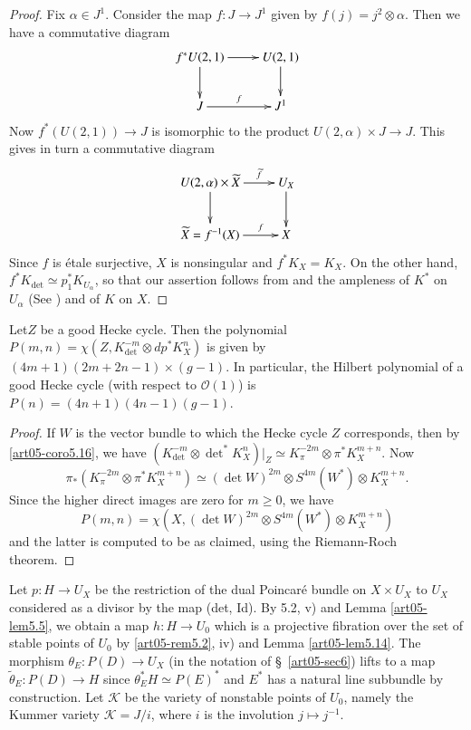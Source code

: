 \begin{proof}
Fix $\alpha\in J^{1}$. Consider the map $f:J\to J^{1}$ given by
$f(j)=j^{2}\otimes \alpha$. Then we have a commutative diagram
\[
\xymatrix{
f^{*}U(2,1)\ar[d]\ar[r] & U(2,1)\ar[d]\\
J\ar[r]^-{f} & J^{1}
}
\]
Now $f^{*}(U(2,1))\to J$ is isomorphic to the product
$U(2,\alpha)\times J\to J$. This gives in turn a commutative diagram
\[
\xymatrix{
U(2,\alpha)\times \widetilde{X}\ar[d]\ar[r]^-{\widetilde{f}} &
U_{X}\ar[d]\\
\widetilde{X}=f^{-1}(X)\ar[r]^-{f} & X
}
\]
Since $f$ is \'etale surjective, $X$ is nonsingular and
$f^{*}K_{X}=K_{X}$. On the other hand, $f^{*}K_{\det}\simeq
p^{*}_{1}K_{U_{\alpha}}$, so that our assertion follows
from \cite[Proposition 4.4]{art05-key2} and the ampleness of $K^{*}$
on $U_{\alpha}$ (See \cite[Theorem 1]{art05-key6}) and of $K$ on $X$.
\end{proof}

\begin{lemma}\label{art05-lem7.2}
Let\pageoriginale $Z$ be a good Hecke cycle. Then the polynomial
$P(m,n)=\chi(Z,K^{-m}_{\det}\otimes dp^{*}K^{n}_{X})$ is given by
$(4m+1)(2m+2n-1)\times (g-1)$. In particular, the Hilbert polynomial
of a good Hecke cycle (with respect to $\mathscr{O}(1)$) is
$P(n)=(4n+1)(4n-1)(g-1)$. 
\end{lemma}

\begin{proof}
If $W$ is the vector bundle to which the Hecke cycle $Z$ corresponds,
then by \ref{art05-coro5.16}, we have
$(K^{-m}_{\det}\otimes \det^{*}K^{n}_{X})|_{Z}\simeq
K^{-2m}_{\pi}\otimes \pi^{*}K^{m+n}_{X}$. Now
$$
\pi_{*}(K^{-2m}_{\pi}\otimes \pi^{*}K^{m+n}_{X})\simeq (\det
W)^{2m}\otimes S^{4m}(W^{*})\otimes K^{m+n}_{X}.
$$
Since the higher direct images are zero for $m\geq 0$, we have
$$
P(m,n)=\chi(X,(\det W)^{2m}\otimes S^{4m}(W^{*})\otimes K^{m+n}_{X})
$$
and the latter is computed to be as claimed, using the Riemann-Roch
theorem. 
\end{proof}

Let $p:H\to U_{X}$ be the restriction of the dual Poincar\'e bundle on
$X\times U_{X}$ to $U_{X}$ considered as a divisor by the map (det,
Id). By 5.2, v) and Lemma \ref{art05-lem5.5}, we obtain a map $h:H\to
U_{0}$ which is a projective fibration over the set of stable points
of $U_{0}$ by \ref{art05-rem5.2}, iv) and
Lemma \ref{art05-lem5.14}. The morphism $\theta_{E}:P(D)\to U_{X}$ (in
the notation of \S\ \ref{art05-sec6}) lifts to a map
$\widetilde{\theta}_{E}:P(D)\to H$ since $\theta^{*}_{E}H\simeq
P(E)^{*}$ and $E^{*}$ has a natural line subbundle by
construction. Let $\mathscr{K}$ be the variety of nonstable points of
$U_{0}$, namely the Kummer variety $\mathscr{K}=J/i$, where $i$ is the
involution $j\mapsto j^{-1}$.

